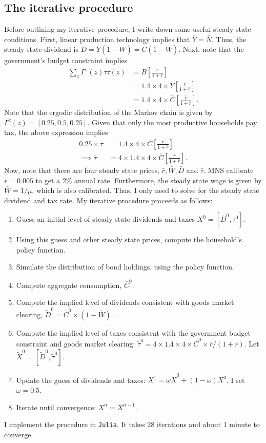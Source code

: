 \documentclass[12pt]{article}
\begin{document}
\subsection{The iterative procedure}
Before outlining my iterative procedure, I write down some useful steady state conditions. First, linear production technology implies that  $\bar Y = \bar N$. Thus, the steady state dividend is $\bar D = \bar Y (1-\bar W) = \bar C (1-\bar W)$. Next, note that the government's budget constraint implies
\begin{align*}
\sum_z \Gamma^z(z)\bar \tau\bar\tau(z) &= B\left[\frac{\bar r}{1+\bar r}\right]\\
&=1.4 \times 4 \times \bar Y \left[\frac{\bar r}{1+\bar r}\right]\\
&=1.4 \times 4 \times \bar C \left[\frac{\bar r}{1+\bar r}\right].
\end{align*}
Note that the ergodic distribution of the Markov chain is given by $\Gamma^z(z) = [0.25,0.5,0.25]$. Given that only the most productive households pay tax, the above expression implies
\begin{align*}
0.25 \times \bar\tau &= 1.4 \times 4 \times \bar C \left[\frac{\bar r}{1+\bar r}\right]\\
\implies \bar \tau &= 4\times 1.4 \times 4 \times \bar C \left[\frac{\bar r}{1+\bar r}\right].
\end{align*}
Now, note that there are four steady state prices, $\bar r, \bar W, \bar D$ and $\bar \tau$. MNS calibrate $\bar r = 0.005$ to get a 2\% annual rate. Furthermore, the steady state wage is given by $\bar W = 1/\mu$, which is also calibrated. Thus, I only need to solve for the steady state dividend and tax rate. My iterative procedure proceeds as follows:
\begin{enumerate}
\item Guess an initial level of steady state dividends and taxes $X^0 = [\bar D^0, \bar\tau^0]$.
\item Using this guess and other steady state prices, compute the household's policy function.
\item Simulate the distribution of bond holdings, using the policy function.
\item Compute aggregate consumption, $\bar C^0$.
\item Compute the implied level of dividends consistent with goods market clearing, $\tilde{D}^0 = \bar{C}^0\times(1-\bar{W})$.
\item Compute the implied level of taxes consistent with the government budget constraint and goods market clearing: $\tilde{\tau}^0 = 4 \times 1.4\times4\times\bar C^0 \times \bar r/(1+\bar r)$. Let $\tilde{X}^0 = [\tilde{D}^0,\tilde{\tau}^0]$.
\item Update the guess of dividends and taxes: $X^1 = \omega  \tilde{X}^0 + (1-\omega)X^0$. I set $\omega=0.5$.
\item Iterate until convergence: $X^n=X^{n-1}$.
\end{enumerate}
I implement the procedure in \verb|Julia|. It takes 28 iterations and about 1 minute to converge.
\end{document}
